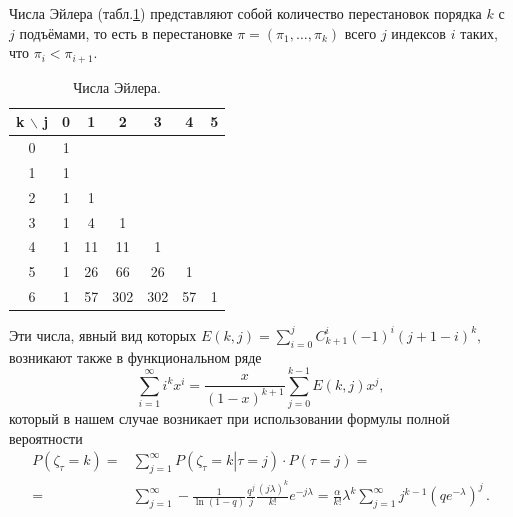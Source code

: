 \documentclass{math-mech-sci}
\begin{document}
	

	
	Числа Эйлера (табл.\ref{tab1}) представляют собой количество перестановок порядка $k$ с $j$ подъёмами, то есть в перестановке $\pi = (\pi _1, \dots, \pi _k)$ всего $j$ индексов $i$ таких, что $\pi _i < \pi _{i + 1}$. 
		
		
		\begin{table}[ht]\centering\begin{tabular}{c|cccccc}
	
			k $\backslash$ j & 0 & 1 & 2 & 3 & 4 & 5\\ \hline
			0 & 1 &  &  &  &  & \\
			1 & 1 &  &  &  &  & \\
			2 & 1 & 1 &  &  &  & \\
			3 & 1 & 4 & 1 &  &  & \\
			4 & 1 & 11 & 11 & 1 &  & \\
			5 & 1 & 26 & 66 & 26 & 1 & \\
			6 & 1 & 57 & 302 & 302 &57 &1 \\
		\end{tabular}
	\caption{Числа Эйлера.}
	\label{tab1}
	\end{table}
	Эти числа, явный вид которых 
$
	E(k, j) = \sum \limits ^j _{i = 0} C ^i _{k + 1} (-1) ^i (j + 1 - i) ^k,
$
	возникают также в функциональном  ряде
	\[
		\sum \limits ^\infty _{i = 1} i ^k x ^i = \frac {x} {(1 - x) ^{k + 1}} \sum \limits ^{k - 1} _{j = 0} E(k, j) x ^j, 
	\]
	который  в нашем случае возникает 
при использовании формулы полной вероятности
	\[
	\begin{aligned}
		P(\zeta_\tau = k) =& \sum \limits ^{\infty} _{j = 1} P(\left.\zeta_\tau = k\right| \tau = j) \cdot P(\tau = j) =\\
		=& \sum \limits ^{\infty} _{j = 1} - \frac 1 {\ln(1 - q)} \frac {q ^j} j \frac {(j \lambda) ^k} {k !} e ^{-j \lambda} = \frac \alpha {k !} \lambda ^k \sum \limits ^{\infty} _{j = 1} j ^{k - 1} \left(q e ^{-\lambda}\right) ^j \,.
	\end{aligned}
	\]
	
%	
	
\end{document}
